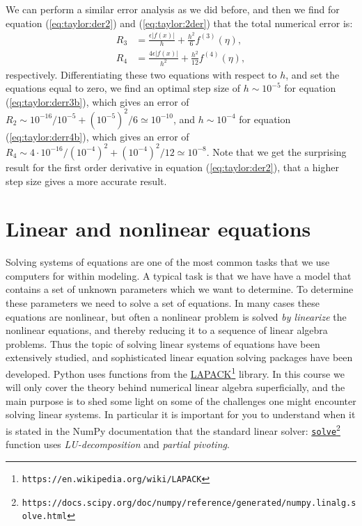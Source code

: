 \documentclass[graybox,sectrefs,envcountresetchap,open=right,final]{svmonodo}
\begin{document}
We can perform a similar error analysis as we did before, and then we find for equation (\ref{eq:taylor:der2}) and (\ref{eq:taylor:2der}) that the total
numerical error is:
\begin{align}
R_3&=\frac{\epsilon|f(x)|}{h}+\frac{h^2}{6}f^{(3)}(\eta),\label{eq:taylor:derr3b}\\ 
R_4&=\frac{4\epsilon|f(x)|}{h^2}+\frac{h^2}{12}f^{(4)}(\eta),\label{eq:taylor:derr4b}
\end{align}
respectively. Differentiating these two equations with respect to $h$, and set the equations equal to zero, we find an optimal step size of
$h\sim10^{-5}$ for equation (\ref{eq:taylor:derr3b}), which gives an error of $R_2\sim 10^{-16}/10^{-5}+(10^{-5})^2/6\simeq10^{-10}$, and $h\sim10^{-4}$ for equation
(\ref{eq:taylor:derr4b}), which gives an error of $R_4\sim 4\cdot10^{-16}/(10^{-4})^2+(10^{-4})^2/12\simeq10^{-8}$. Note that we get the surprising result for the first order 
derivative in equation (\ref{eq:taylor:der2}), that a higher step size gives a more accurate result. 







\chapter{Linear and nonlinear equations}
\label{ch:nlin}
Solving systems of equations are one of the most common tasks that we use computers for within modeling. A typical task is that we have have a model that contains a set of unknown parameters which we want to determine. To determine these parameters we need to solve a set of equations. In many cases these equations are nonlinear, but often a nonlinear problem is solved
\emph{by linearize} the nonlinear equations, and thereby reducing it to a sequence of linear algebra problems. Thus the topic of solving linear systems of equations have been extensively studied, and sophisticated linear equation solving packages have been developed. Python uses functions from the \href{{https://en.wikipedia.org/wiki/LAPACK}}{LAPACK}\footnote{\texttt{https://en.wikipedia.org/wiki/LAPACK}} library. In this course we will only cover the theory behind numerical linear algebra superficially, and the main purpose is to shed some light on some of the challenges one might encounter solving linear systems. In particular it is important for you to understand when it is stated in the NumPy documentation that the standard linear solver: \href{{https://docs.scipy.org/doc/numpy/reference/generated/numpy.linalg.solve.html}}{\nolinkurl{solve}\footnote{\texttt{https://docs.scipy.org/doc/numpy/reference/generated/numpy.linalg.solve.html}}} function uses \emph{LU-decomposition} and \emph{partial pivoting}. 
\end{document}
